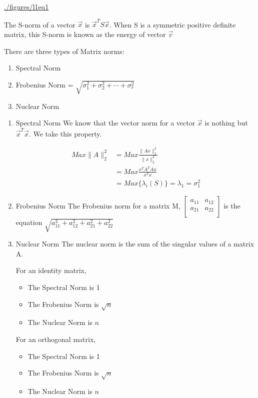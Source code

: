 \documentclass[11pt]{report}
\begin{document}
\label{fig:l1eq1}
\url{./figures/l1eq1}

The S-norm of a vector \(\vec{x}\) is \(\vec{x}^T S \vec{x}\). When S is
a symmetric positive definite matrix, this S-norm is known as the energy
of vector \(\vec{v}\)

There are three types of Matrix norms:

\begin{enumerate}
\item Spectral Norm

\item Frobenius Norm =
\(\sqrt{\sigma_1^2 + \sigma_2^2 + \cdots + \sigma_r^2}\)

\item Nuclear Norm
\end{enumerate}
\begin{enumerate}
\item Spectral Norm
\label{spectral-norm}
We know that the vector norm for a vector \(\vec{x}\) is nothing but
\(\vec{x}^T \vec{x}\). We take this property.

\[\begin{aligned}
    Max \|A\|_2^2 &= Max \frac{\|Ax\|_2^2}{\|x\|_2^2} \\
              &= Max \frac{x^TA^TAx}{x^Tx} \\
              &= Max \{\lambda_i(S)\} = \lambda_1 = \sigma_1^2
\end{aligned}\]
\item Frobenius Norm
\label{frobenius-norm}
The Frobenius norm for a matrix M, \(\begin{bmatrix}
    a_{11} & a_{12}\\
a_{21} & a_{22} \\
\end{bmatrix}\) is the equation
\(\sqrt{a_{11}^2 + a_{12}^2 + a_{21}^2 + a_{22}^2}\)
\item Nuclear Norm
\label{nuclear-norm}
The nuclear norm is the sum of the singular values of a matrix A.

For an identity matrix,

\begin{itemize}
\item The Spectral Norm is 1

\item The Frobenius Norm is \(\sqrt{n}\)

\item The Nuclear Norm is \({n}\)
\end{itemize}

For an orthogonal matrix,

\begin{itemize}
\item The Spectral Norm is 1

\item The Frobenius Norm is \(\sqrt{n}\)

\item The Nuclear Norm is \({n}\)
\end{itemize}
\end{enumerate}
\end{document}
